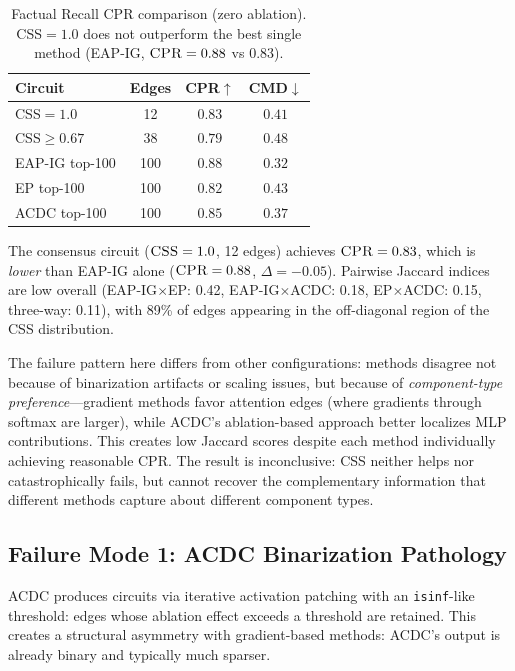 \documentclass[11pt,a4paper]{article}
\newcommand{\css}{\textsc{CSS}}
\newcommand{\cpr}{\textsc{CPR}}
\newcommand{\cmd}{\textsc{CMD}}
\begin{document}
\begin{table}[t]
\centering
\small
\begin{tabular}{lccc}
\toprule
\textbf{Circuit} & \textbf{Edges} & \textbf{\cpr{}$\uparrow$} & \textbf{\cmd{}$\downarrow$} \\
\midrule
\css{}$=1.0$ & 12 & $0.83$ & $0.41$ \\
\css{}$\geq 0.67$ & 38 & $0.79$ & $0.48$ \\
EAP-IG top-100 & 100 & $0.88$ & $0.32$ \\
EP top-100 & 100 & $0.82$ & $0.43$ \\
ACDC top-100 & 100 & $0.85$ & $0.37$ \\
\bottomrule
\end{tabular}
\caption{Factual Recall \cpr{} comparison (zero ablation). \css{}$=1.0$ does not outperform the best single method (EAP-IG, $\cpr{}=0.88$ vs $0.83$).}
\label{tab:factual}
\end{table}

The consensus circuit ($\css{}=1.0$, 12 edges) achieves $\cpr{}=0.83$, which is \emph{lower} than EAP-IG alone ($\cpr{}=0.88$, $\Delta=-0.05$). Pairwise Jaccard indices are low overall (EAP-IG$\times$EP: 0.42, EAP-IG$\times$ACDC: 0.18, EP$\times$ACDC: 0.15, three-way: 0.11), with 89\% of edges appearing in the off-diagonal region of the CSS distribution.

The failure pattern here differs from other configurations: methods disagree not because of binarization artifacts or scaling issues, but because of \emph{component-type preference}---gradient methods favor attention edges (where gradients through softmax are larger), while ACDC's ablation-based approach better localizes MLP contributions. This creates low Jaccard scores despite each method individually achieving reasonable \cpr{}. The result is inconclusive: \css{} neither helps nor catastrophically fails, but cannot recover the complementary information that different methods capture about different component types.

\subsection{Failure Mode 1: ACDC Binarization Pathology}
\label{sec:binarization}

ACDC produces circuits via iterative activation patching with an \texttt{isinf}-like threshold: edges whose ablation effect exceeds a threshold are retained. This creates a structural asymmetry with gradient-based methods: ACDC's output is already binary and typically much sparser.
\end{document}
